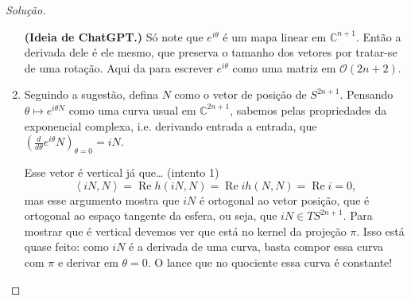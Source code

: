 \begin{proof}[Solução]
\begin{enumerate}[label=(\alph*)]
	\textbf{(Ideia de ChatGPT.)} Só note que \(e^{i\theta}\) é um mapa linear em \(\mathbb{C}^{n+1}\). Então a derivada dele é ele mesmo, que preserva o tamanho dos vetores por tratar-se de uma rotação. Aqui da para escrever \(e^{i\theta}\) como uma matriz em \(\mathcal{O}(2n+2)\).\fi
\item Seguindo a sugestão, defina \(N\) como o vetor de posição de \(S^{2n+1}\). Pensando \(\theta \mapsto e^{i\theta N}\) como uma curva usual em \(\mathbb{C}^{2n+1}\), sabemos pelas propriedades da exponencial complexa, i.e. derivando entrada a entrada, que \((\frac{d}{d\theta}e^{i\theta}N)_{\theta=0}=i N\).

	Esse vetor é vertical já que… (intento 1) \[\left<i N,N\right>=\operatorname{Re}h(i N,N)=\operatorname{Re}ih(N,N)=\operatorname{Re}i=0,\] mas esse argumento mostra que \(i N\) é ortogonal ao vetor posição, que é ortogonal ao espaço tangente da esfera, ou seja, que \(i N \in TS^{2n+1}\). Para mostrar que é vertical devemos ver que está no kernel da projeção \(\pi\). Isso está quase feito: como \(i N\) é a derivada de uma curva, basta compor essa curva com \(\pi\) e derivar em \(\theta=0\). O lance que no quociente essa curva é constante!


\end{enumerate}
\end{proof}

